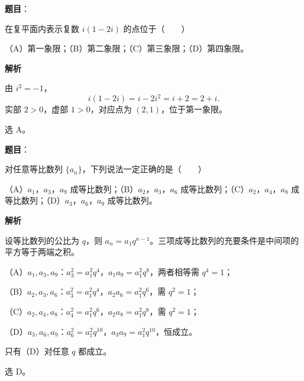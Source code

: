 

\begin{answer}

\textbf{题目}：

在复平面内表示复数 $i(1-2i)$ 的点位于\mbox{（　　）}

（A）第一象限；（B）第二象限；（C）第三象限；（D）第四象限。

\textbf{解析}

由 $i^2=-1$，
\nopagebreak[4]
\[i(1-2i)=i-2i^2=i+2=2+i .\]
实部 $2>0$，虚部 $1>0$，对应点为 $(2,1)$，位于第一象限。

选 A。


\end{answer}
\begin{answer}

\textbf{题目}：

对任意等比数列 $\{a_n\}$，下列说法一定正确的是\mbox{（　　）}

（A）$a_1$，$a_3$，$a_9$ 成等比数列；（B）$a_2$，$a_3$，$a_6$ 成等比数列；（C）$a_2$，$a_4$，$a_8$ 成等比数列；（D）$a_3$，$a_6$，$a_9$ 成等比数列。

\textbf{解析}

设等比数列的公比为 $q$，则 $a_n=a_1q^{n-1}$。三项成等比数列的充要条件是中间项的平方等于两端之积。

（A）$a_1,a_3,a_9$：$a_3^2=a_1^2q^4$，$a_1a_9=a_1^2q^8$，两者相等需 $q^4=1$；

（B）$a_2,a_3,a_6$：$a_3^2=a_1^2q^4$，$a_2a_6=a_1^2q^6$，需 $q^2=1$；

（C）$a_2,a_4,a_8$：$a_4^2=a_1^2q^6$，$a_2a_8=a_1^2q^8$，需 $q^2=1$；

（D）$a_3,a_6,a_9$：$a_6^2=a_1^2q^{10}$，$a_3a_9=a_1^2q^{10}$，恒成立。

只有（D）对任意 $q$ 都成立。

选 D。


\end{answer}
